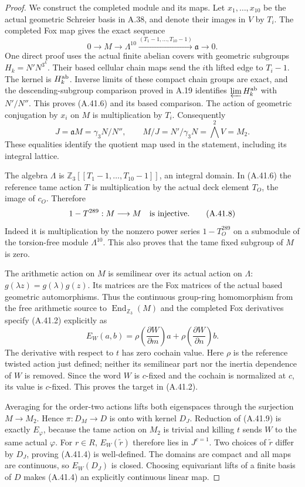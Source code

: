\begin{proof}
We construct the completed module and its maps. Let
$x_1,\ldots,x_{10}$ be the actual geometric Schreier basis
in A.38, and denote their images in $V$ by $T_i$. The
completed Fox map gives the exact sequence
\[
 0\longrightarrow M\longrightarrow\Lambda^{10}
    \xrightarrow{(T_1-1,\ldots,T_{10}-1)}\mathfrak a
      \longrightarrow0.
 \tag{A.41.6}
\]
One direct proof uses the actual finite abelian covers with
geometric subgroups $H_k=N'N^{3^k}$. Their based cellular
chain maps send the $i$th lifted edge to $T_i-1$. The kernel
is $H_k^{\rm ab}$. Inverse limits of these compact chain
groups are exact, and the descending-subgroup comparison
proved in A.19 identifies
$\varprojlim H_k^{\rm ab}$ with $N'/N''$. This proves
(A.41.6) and its based comparison. The action of geometric
conjugation by $x_i$ on $M$ is multiplication by $T_i$.
Consequently
\[
  J=\mathfrak aM=\gamma_3N/N'',\qquad
  M/J=N'/\gamma_3N=\bigwedge^2V=M_2.
 \tag{A.41.7}
\]
These equalities identify the quotient map used in the
statement, including its integral lattice.

The algebra $\Lambda$ is
$\mathbb Z_3[[T_1-1,\ldots,T_{10}-1]]$, an integral domain.
In (A.41.6) the reference tame action $T$ is multiplication
by the actual deck element $T_O$, the image of $c_O$.
Therefore
\[
                   1-T^{289}:M\longrightarrow M
                         \quad\hbox{is injective}.
 \tag{A.41.8}
\]
Indeed it is multiplication by the nonzero power series
$1-T_O^{289}$ on a submodule of the torsion-free module
$\Lambda^{10}$. This also proves that the tame fixed
subgroup of $M$ is zero.

The arithmetic action on $M$ is semilinear over its actual
action on $\Lambda$: $g(\lambda z)=g(\lambda)g(z)$.
Its matrices are the Fox matrices of the actual based
geometric automorphisms. Thus the continuous group-ring
homomorphism from the free arithmetic source to
$\operatorname{End}_{\mathbb Z_3}(M)$ and the completed Fox
derivatives specify (A.41.2) explicitly as
\[
 E_W(a,b)=\rho\!\left(\frac{\partial W}{\partial m}\right)a
          +\rho\!\left(\frac{\partial W}{\partial n}\right)b.
 \tag{A.41.9}
\]
The derivative with respect to $t$ has zero cochain value.
Here $\rho$ is the reference twisted action just defined;
neither its semilinear part nor the inertia dependence of
$W$ is removed. Since the word $W$ is $c$-fixed and the
cochain is normalized at $c$, its value is $c$-fixed.
This proves the target in (A.41.2).

Averaging for the order-two actions lifts both eigenspaces
through the surjection $M\to M_2$. Hence $\pi:D_M\to D$ is
onto with kernel $D_J$. Reduction of (A.41.9) is exactly
$E_\varphi$, because the tame action on $M_2$ is trivial and
killing $t$ sends $W$ to the same actual $\varphi$. For
$r\in R$, $E_W(\widetilde r)$ therefore lies in $J^{c=1}$.
Two choices of $\widetilde r$ differ by $D_J$, proving
(A.41.4) is well-defined. The domains are compact and all
maps are continuous, so $E_W(D_J)$ is closed. Choosing
equivariant lifts of a finite basis of $D$ makes (A.41.4)
an explicitly continuous linear map.


\end{proof}
